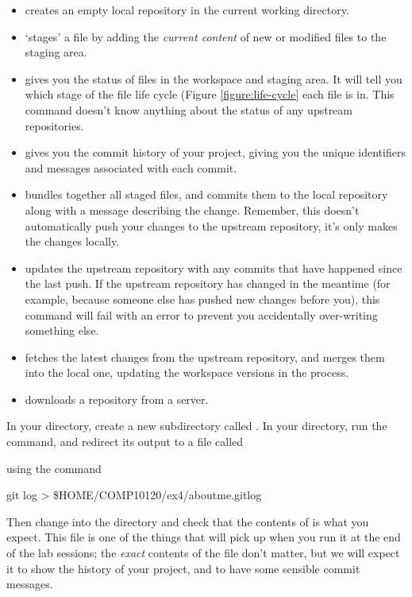 \begin{itemize}
\item {} creates an empty local repository in the current working directory. 
\item {} `stages' a file by adding the \emph{current content} of new or modified files to the staging area. 
\item {} gives you the status of files in the workspace and staging area. It will tell you which stage of the file life cycle (Figure \ref{figure:life-cycle} each file is in. This command doesn't know anything about the status of any upstream repositories.
\item {} gives you the commit history of your project, giving you the unique identifiers and messages associated with each commit.
\item {} bundles together all staged files, and commits them to the local repository along with a message describing the change. Remember, this doesn't automatically push your changes to the upstream repository, it's only makes the changes locally. 
\item {} updates the upstream repository with any commits that have happened since the last push. If the upstream repository has changed in the meantime (for example, because someone else has pushed new changes before you), this command will fail with an error to prevent you accidentally over-writing something else.
\item {} fetches the latest changes from the upstream repository, and merges them into the local one, updating the workspace versions in the process.
\item {} downloads a repository from a server.  
\end{itemize}



In your  directory, create a new subdirectory called . In your  directory, run the  command, and redirect its output to a file called
\begin{center}
\end{center}
 using the command  
\begin{ttoutenv}
git log > \$HOME/COMP10120/ex4/aboutme.gitlog
\end{ttoutenv}

Then change into the  directory and check that the contents of  is what you expect. This file is one of the things that  will pick up when you run it at the end of the lab sessions; the \emph{exact} contents of the file don't matter, but we will expect it to show the history of your  project, and to have some sensible commit messages. 

